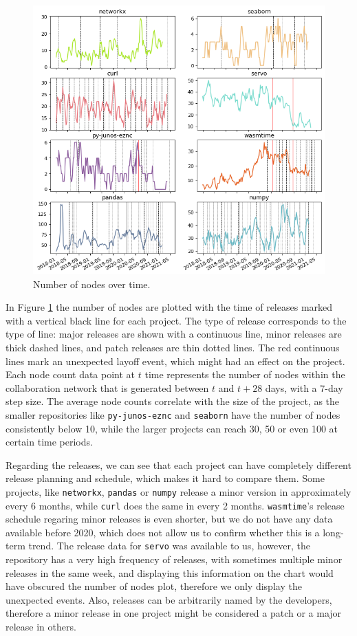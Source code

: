\begin{figure}
    \centering
    \includegraphics[width=\textwidth]{figures/qualitative/number_of_nodes/all_v2.png}
    \caption{Number of nodes over time.}
    \label{fig:nnodes}
\end{figure}

In Figure \ref{fig:nnodes} the number of nodes are plotted with the time of releases marked with a vertical black line for each project. The type of release corresponds to the type of line: major releases are shown with a continuous line, minor releases are thick dashed lines, and patch releases are thin dotted lines. The red continuous lines mark an unexpected layoff event, which might had an effect on the project. Each node count data point at $t$ time represents the number of nodes within the collaboration network that is generated between $t$ and $t+28$ days, with a 7-day step size. The average node counts correlate with the size of the project, as the smaller repositories like \texttt{py-junos-eznc} and \texttt{seaborn} have the number of nodes consistently below 10, while the larger projects can reach 30, 50 or even 100 at certain time periods.

Regarding the releases, we can see that each project can have completely different release planning and schedule, which makes it hard to compare them. Some projects, like \texttt{networkx}, \texttt{pandas} or \texttt{numpy} release a minor version in approximately every 6 months, while \texttt{curl} does the same in every 2 months. \texttt{wasmtime}'s release schedule regaring minor releases is even shorter, but we do not have any data available before 2020, which does not allow us to confirm whether this is a long-term trend. The release data for \texttt{servo} was available to us, however, the repository has a very high frequency of releases, with sometimes multiple minor releases in the same week, and displaying this information on the chart would have obscured the number of nodes plot, therefore we only display the unexpected events. Also, releases can be arbitrarily named by the developers, therefore a minor release in one project might be considered a patch or a major release in others.


